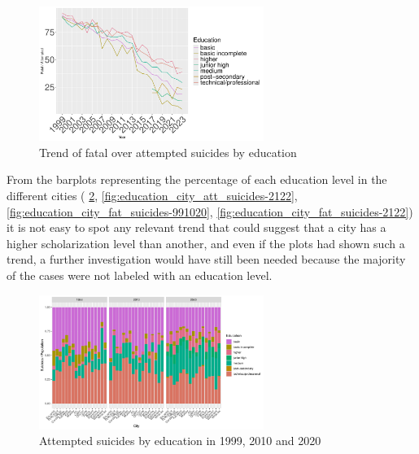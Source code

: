 \documentclass{article}
\begin{document}
\begin{figure}[H]
    \centering
    \includegraphics[width=0.65\textwidth]{imgs/education_foa.pdf}
    \caption{Trend of fatal over attempted suicides by education }
    \label{fig:education_foa}
\end{figure}


From the barplots representing the percentage of each education level
in the different cities (
\ref {fig:education_city_att_suicides-991020},
\ref {fig:education_city_att_suicides-2122},
\ref {fig:education_city_fat_suicides-991020},
\ref {fig:education_city_fat_suicides-2122})
it is not easy to spot any relevant trend that could suggest that a city
has a higher scholarization level than another, and even if the plots
had shown such a trend, a further investigation would have still been needed
because the majority of the cases were not labeled with an education level.
\begin{figure}[H]
    \centering
    \includegraphics[width=0.65\textwidth]{imgs/education_city_att_suicides-991020.pdf}
    \caption{Attempted suicides by education  in 1999, 2010 and 2020}
    \label{fig:education_city_att_suicides-991020}
\end{figure}
\end{document}

